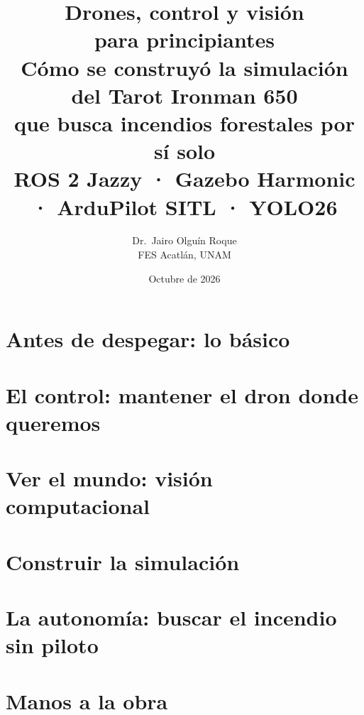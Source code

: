 \documentclass[11pt,letterpaper,oneside,openany]{book}
\title{\textbf{Drones, control y visión}\\[4pt]
\textbf{para principiantes}\\[10pt]
\Large Cómo se construyó la simulación del Tarot Ironman 650\\ que busca incendios forestales por sí solo\\[8pt]
\large ROS 2 Jazzy · Gazebo Harmonic · ArduPilot SITL · YOLO26}
\author{Dr.\ Jairo Olguín Roque\\
FES Acatlán, UNAM}
\date{Octubre de 2026}
\begin{document}
\frontmatter
\maketitle
\tableofcontents


\mainmatter
\part{Antes de despegar: lo básico}






\part{El control: mantener el dron donde queremos}





\part{Ver el mundo: visión computacional}




\part{Construir la simulación}





\part{La autonomía: buscar el incendio sin piloto}





\part{Manos a la obra}




\appendix


\end{document}
